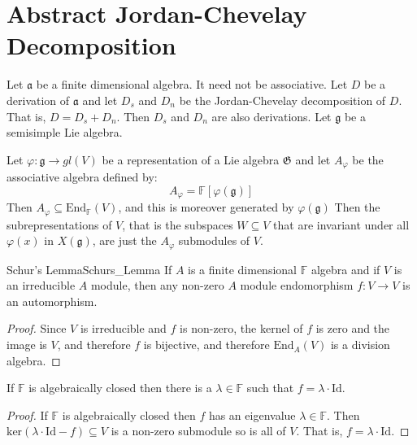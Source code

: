 \section{Abstract Jordan-Chevelay Decomposition}
    Let $\mathfrak{a}$ be a finite dimensional algebra. It need not be
    associative. Let $D$ be a derivation of $\mathfrak{a}$ and let
    $D_{s}$ and $D_{n}$ be the Jordan-Chevelay decomposition of $D$. That
    is, $D=D_{s}+D_{n}$. Then $D_{s}$ and $D_{n}$ are also derivations. Let
    $\mathfrak{g}$ be a semisimple Lie algebra.
    \par\hfill\par
    Let $\varphi:\mathfrak{g}\rightarrow{gl}(V)$ be a representation of a
    Lie algebra $\mathfrak{G}$ and let $A_{\varphi}$ be the associative
    algebra defined by:
    \begin{equation}
        A_{\varphi}=\mathbb{F}[\varphi(\mathfrak{g})]
    \end{equation}
    Then $A_{\varphi}\subseteq\textrm{End}_{\mathbb{F}}(V)$, and this is
    moreover generated by $\varphi(\mathfrak{g})$ Then the
    subrepresentations of $V$, that is the subspaces $W\subseteq{V}$ that
    are invariant under all $\varphi(x)$ in $X(\mathfrak{g})$, are just the
    $A_{\varphi}$ submodules of $V$.
    \begin{ltheorem}{Schur's Lemma}{Schurs_Lemma}
        If $A$ is a finite dimensional $\mathbb{F}$ algebra and if $V$ is
        an irreducible $A$ module, then any non-zero $A$ module
        endomorphism $f:V\rightarrow{V}$ is an automorphism.
    \end{ltheorem}
    \begin{proof}
        Since $V$ is irreducible and $f$ is non-zero, the kernel of $f$ is
        zero and the image is $V$, and therefore $f$ is bijective, and
        therefore $\textrm{End}_{A}(V)$ is a division algebra.
    \end{proof}
    \begin{theorem}
        If $\mathbb{F}$ is algebraically closed then there is a
        $\lambda\in\mathbb{F}$ such that $f=\lambda\cdot\textrm{Id}$.
    \end{theorem}
    \begin{proof}
        If $\mathbb{F}$ is algebraically closed then $f$ has an eigenvalue
        $\lambda\in\mathbb{F}$. Then
        $\textrm{ker}(\lambda\cdot\textrm{Id}-f)\subseteq{V}$ is a non-zero
        submodule so is all of $V$. That is, $f=\lambda\cdot\textrm{Id}$.
    \end{proof}
